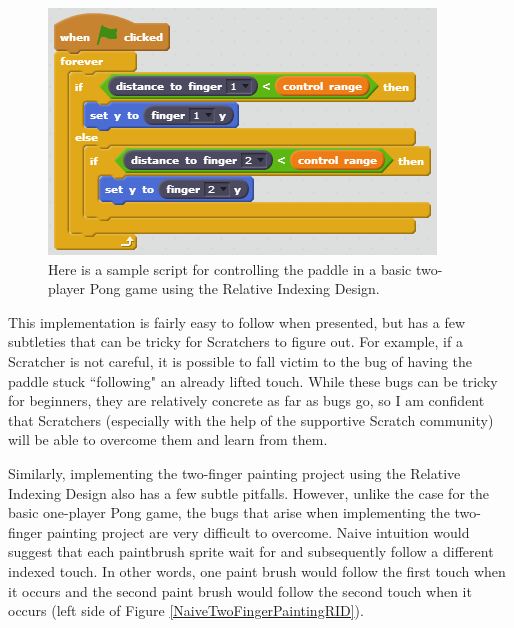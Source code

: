 \begin{figure}
\centering
\includegraphics{images/BasicTwoPlayerPongRID.PNG}
\caption[Sample Relative Indexing Design Script For Basic Two-Player Pong]{Here is a sample script for controlling the paddle in a basic two-player Pong game using the Relative Indexing Design.}
\label{BasicTwoPlayerPongRID}
\end{figure}

This implementation is fairly easy to follow when presented, but has a few subtleties that can be tricky for Scratchers to figure out. For example, if a Scratcher is not careful, it is possible to fall victim to the bug of having the paddle stuck ``following" an already lifted touch. While these bugs can be tricky for beginners, they are relatively concrete as far as bugs go, so I am confident that Scratchers (especially with the help of the supportive Scratch community) will be able to overcome them and learn from them. 

Similarly, implementing the two-finger painting project using the Relative Indexing Design also has a few subtle pitfalls. However, unlike the case for the basic one-player Pong game, the bugs that arise when implementing the two-finger painting project are very difficult to overcome. Naive intuition would suggest that each paintbrush sprite wait for and subsequently follow a different indexed touch. In other words, one paint brush would follow the first touch when it occurs and the second paint brush would follow the second touch when it occurs (left side of Figure \ref{NaiveTwoFingerPaintingRID}).

